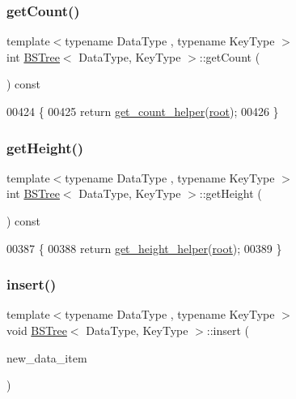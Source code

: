 \subsubsection{\texorpdfstring{get\+Count()}{getCount()}}
{\footnotesize\ttfamily template$<$typename Data\+Type , typename Key\+Type $>$ \\
int \hyperlink{class_b_s_tree}{B\+S\+Tree}$<$ Data\+Type, Key\+Type $>$\+::get\+Count (\begin{DoxyParamCaption}{ }\end{DoxyParamCaption}) const}


\begin{DoxyCode}
00424 \{
00425     \textcolor{keywordflow}{return} \hyperlink{class_b_s_tree_a8b7d2aea1aef9e8abf213cfaaa9230ed}{get\_count\_helper}(\hyperlink{class_b_s_tree_a83534afce9094181ac031f9f596a8625}{root});
00426 \}
\end{DoxyCode}
\hypertarget{class_b_s_tree_a9e8f8c02f31a9ed55458b569dd809d62}{}\label{class_b_s_tree_a9e8f8c02f31a9ed55458b569dd809d62} 
\subsubsection{\texorpdfstring{get\+Height()}{getHeight()}}
{\footnotesize\ttfamily template$<$typename Data\+Type , typename Key\+Type $>$ \\
int \hyperlink{class_b_s_tree}{B\+S\+Tree}$<$ Data\+Type, Key\+Type $>$\+::get\+Height (\begin{DoxyParamCaption}{ }\end{DoxyParamCaption}) const}


\begin{DoxyCode}
00387 \{
00388     \textcolor{keywordflow}{return} \hyperlink{class_b_s_tree_ad8a9303c63c71724cc1bba081edce42a}{get\_height\_helper}(\hyperlink{class_b_s_tree_a83534afce9094181ac031f9f596a8625}{root});
00389 \}
\end{DoxyCode}
\hypertarget{class_b_s_tree_a3136c063de9adf6f55e524ad099df62f}{}\label{class_b_s_tree_a3136c063de9adf6f55e524ad099df62f} 
\subsubsection{\texorpdfstring{insert()}{insert()}}
{\footnotesize\ttfamily template$<$typename Data\+Type , typename Key\+Type $>$ \\
void \hyperlink{class_b_s_tree}{B\+S\+Tree}$<$ Data\+Type, Key\+Type $>$\+::insert (\begin{DoxyParamCaption}\item[{const Data\+Type \&}]{new\+\_\+data\+\_\+item }\end{DoxyParamCaption})}


